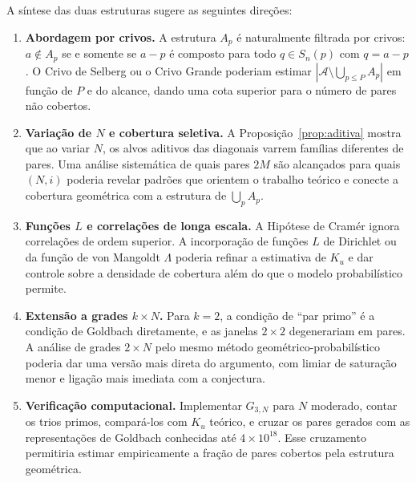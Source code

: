 \documentclass[12pt,a4paper]{article}
\theoremstyle{remark}
\newcommand{\calA}{\mathcal{A}}
\begin{document}
	A s\'intese das duas estruturas sugere as seguintes dire\c{c}\~oes:
	
	\begin{enumerate}
		\item \textbf{Abordagem por crivos.}
		A estrutura $A_p$ \'e naturalmente filtrada por crivos:
		$a\notin A_p$ se e somente se $a-p$ \'e composto para todo
		$q\in S_n(p)$ com $q=a-p$.
		O Crivo de Selberg ou o Crivo Grande poderiam estimar
		$|\calA\setminus\bigcup_{p\leq P} A_p|$ em fun\c{c}\~ao de $P$
		e do alcance, dando uma cota superior para o n\'umero de pares n\~ao cobertos.
		
		\item \textbf{Varia\c{c}\~ao de $N$ e cobertura seletiva.}
		A Proposi\c{c}\~ao~\ref{prop:aditiva} mostra que ao variar $N$,
		os alvos aditivos das diagonais varrem fam\'ilias diferentes de pares.
		Uma an\'alise sistem\'atica de quais pares $2M$ s\~ao alcan\c{c}ados
		para quais $(N,i)$ poderia revelar padr\~oes que orientem o trabalho te\'orico
		e conecte a cobertura geom\'etrica com a estrutura de $\bigcup_p A_p$.
		
		\item \textbf{Fun\c{c}\~oes $L$ e correla\c{c}\~oes de longa escala.}
		A Hip\'otese de Cram\'er ignora correla\c{c}\~oes de ordem superior.
		A incorpora\c{c}\~ao de fun\c{c}\~oes $L$ de Dirichlet ou da fun\c{c}\~ao
		de von Mangoldt $\Lambda$ poderia refinar a estimativa de $K_u$ e dar
		controle sobre a densidade de cobertura al\'em do que o modelo probabil\'istico
		permite.
		
		\item \textbf{Extens\~ao a grades $k\times N$.}
		Para $k=2$, a condi\c{c}\~ao de ``par primo'' \'e a condi\c{c}\~ao de Goldbach
		diretamente, e as janelas $2\times 2$ degenerariam em pares.
		A an\'alise de grades $2\times N$ pelo mesmo m\'etodo geom\'etrico-probabil\'istico
		poderia dar uma vers\~ao mais direta do argumento, com limiar de satura\c{c}\~ao
		menor e liga\c{c}\~ao mais imediata com a conjectura.
		
		\item \textbf{Verifica\c{c}\~ao computacional.}
		Implementar $G_{3,N}$ para $N$ moderado, contar os trios primos,
		compar\'a-los com $K_u$ te\'orico, e cruzar os pares gerados com as
		representa\c{c}\~oes de Goldbach conhecidas at\'e $4\times 10^{18}$.
		Esse cruzamento permitiria estimar empiricamente a fra\c{c}\~ao de pares
		cobertos pela estrutura geom\'etrica.
	\end{enumerate}
	
\end{document}
